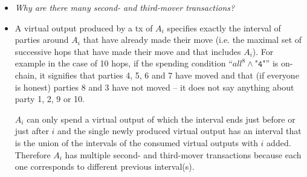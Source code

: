 \begin{itemize}
  \item \emph{Why are there many second- and third-mover transactions?}
  \item A virtual output produced by a tx of $A_i$ specifies exactly the
  interval of parties around $A_i$ that have already made their move (i.e. the
  maximal set of successive hops that have made their move and that includes
  $A_i$). For example in the case of 10 hops, if the spending condition
  ``$\mathit{all}^8 \wedge \texttt{"4"}$'' is on-chain, it signifies that
  parties 4, 5, 6 and 7 have moved and that (if everyone is honest) parties 8 and 3
  have not moved -- it does not say anything about party 1, 2, 9 or 10.

  $A_i$ can only spend a virtual output of which the interval ends just before
  or just after $i$ and the single newly produced virtual output has an interval
  that is the union of the intervals of the consumed virtual outputs with $i$
  added.  Therefore $A_i$ has multiple second- and third-mover transactions
  because each one corresponds to different previous interval(s).


\end{itemize}
